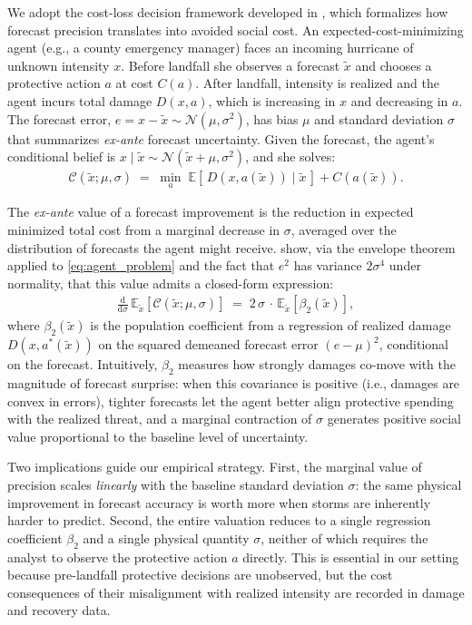 \documentclass[12pt]{article}%
\begin{document}
We adopt the cost-loss decision framework developed in \citet{molina2024social}, which formalizes how forecast precision translates into avoided social cost. An expected-cost-minimizing agent (e.g., a county emergency manager) faces an incoming hurricane of unknown intensity $x$. Before landfall she observes a forecast $\tilde{x}$ and chooses a protective action $a$ at cost $C(a)$. After landfall, intensity is realized and the agent incurs total damage $D(x, a)$, which is increasing in $x$ and decreasing in $a$. The forecast error, $e = x - \tilde{x} \sim \mathcal{N}(\mu, \sigma^2)$, has bias $\mu$ and standard deviation $\sigma$ that summarizes \emph{ex-ante} forecast uncertainty. Given the forecast, the agent's conditional belief is $x \mid \tilde{x} \sim \mathcal{N}(\tilde{x}+\mu,\sigma^2)$, and she solves:
\begin{align}\label{eq:agent_problem}
    \mathcal{C}(\tilde{x};\mu,\sigma) \;=\;
    \min_{a}\;\mathbb{E}\!\left[\,D(x,a(\tilde{x}))\mid \tilde{x}\,\right] + C(a(\tilde{x})).
\end{align}

The \emph{ex-ante} value of a forecast improvement is the reduction in expected minimized total cost from a marginal decrease in $\sigma$, averaged over the distribution of forecasts the agent might receive. \citet{molina2024social} show, via the envelope theorem applied to \eqref{eq:agent_problem} and the fact that $e^2$ has variance $2\sigma^4$ under normality, that this value admits a closed-form expression:
\begin{align}\label{eq:voi_marginal}
    \frac{\mathrm{d}}{\mathrm{d}\sigma}\,\mathbb{E}_{\tilde{x}}\!\left[\mathcal{C}(\tilde{x};\mu,\sigma)\right] \;=\;
    2\,\sigma\,\cdot\,\mathbb{E}_{\tilde{x}}\!\left[\beta_{2}(\tilde{x})\right],
\end{align}
where $\beta_{2}(\tilde{x})$ is the population coefficient from a regression of realized damage $D(x,a^{*}(\tilde{x}))$ on the squared demeaned forecast error $(e-\mu)^{2}$, conditional on the forecast. Intuitively, $\beta_{2}$ measures how strongly damages co-move with the magnitude of forecast surprise: when this covariance is positive (i.e., damages are convex in errors), tighter forecasts let the agent better align protective spending with the realized threat, and a marginal contraction of $\sigma$ generates positive social value proportional to the baseline level of uncertainty.

Two implications guide our empirical strategy. First, the marginal value of precision scales \emph{linearly} with the baseline standard deviation $\sigma$: the same physical improvement in forecast accuracy is worth more when storms are inherently harder to predict. Second, the entire valuation reduces to a single regression coefficient $\beta_{2}$ and a single physical quantity $\sigma$, neither of which requires the analyst to observe the protective action $a$ directly. This is essential in our setting because pre-landfall protective decisions are unobserved, but the cost consequences of their misalignment with realized intensity are recorded in damage and recovery data.
\end{document}

